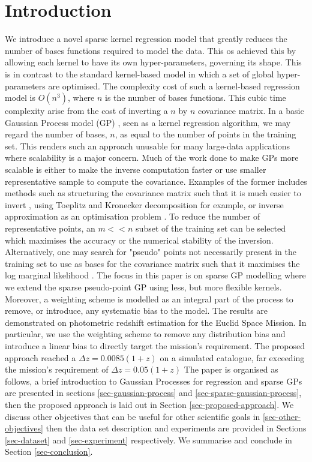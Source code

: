 \documentclass[useAMS,usenatbib,fleqn]{mn2e}
\begin{document}
\section{Introduction}
We introduce a novel sparse kernel regression model that greatly reduces the number of bases functions required to model the data. This os achieved this by allowing each kernel to have its own hyper-parameters, governing its shape. This is in contrast to the standard kernel-based model in which a set of global hyper-parameters are optimised. The complexity cost of such a kernel-based regression model is $O(n^{3})$, where $n$ is the number of bases functions. This cubic time complexity arise from the cost of inverting a $n$ by $n$ covariance matrix. In a basic Gaussian Process model (GP) \cite{rasmussen+williams}, seen as a kernel regression algorithm, we may regard the number of bases, $n$, as equal to the number of points in the training set. This renders such an approach unusable for many large-data applications where scalability is a major concern. Much of the work done to make GPs more scalable \cite{sparseGPcitations} is either to make the inverse computation faster or use smaller representative sample to compute the covariance. Examples of the former includes methods such as structuring the covariance matrix such that it is much easier to invert \cite{}, using Toeplitz and Kronecker decomposition for example, or inverse approximation as an optimisation problem \cite{}. To reduce the number of representative points, an $m << n$ subset of the training set can be selected which maximises the accuracy or the numerical stability of the inversion. Alternatively, one may search for "pseudo" points not necessarily present in the training set to use as bases for the covariance matrix such that it maximises the log marginal likelihood \cite{}. The focus in this paper is on sparse GP modelling where we extend the sparse pseudo-point GP using less, but more flexible kernels. Moreover, a weighting scheme is modelled as an integral part of the process to remove, or introduce, any systematic bias to the model. The results are demonstrated on photometric redshift estimation for the Euclid Space Mission. In particular, we use the weighting scheme to remove any distribution bias and introduce a linear bias to directly target the mission's requirement. The proposed approach reached a $\Delta z = 0.0085(1+z)$ on a simulated catalogue, far exceeding the mission's requirement of $\Delta z = 0.05(1+z)$ The paper is organised as follows, a brief introduction to Gaussian Processes for regression and sparse GPs are presented in sections \ref{sec-gaussian-process} and \ref{sec-sparse-gaussian-process},  then the proposed approach is laid out in Section \ref{sec-proposed-approach}. We discuss other objectives that can be useful for other scientific goals in \ref{sec-other-objectives} then the data set description and experiments are provided in Sections \ref{sec-dataset} and \ref{sec-experiment} respectively. We summarise and conclude in Section \ref{sec-conclusion}.
\end{document}
